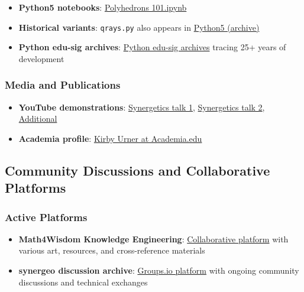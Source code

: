 \documentclass[
  10pt,
]{article}
\newcommand{\passthrough}[1]{#1}
\providecommand{\tightlist}{%
  \setlength{\itemsep}{0pt}\setlength{\parskip}{0pt}}
\begin{document}
\begin{itemize}
\tightlist
\item
  \textbf{Python5 notebooks}:
  \href{https://raw.githubusercontent.com/4dsolutions/Python5/master/Polyhedrons\%20101.ipynb}{Polyhedrons
  101.ipynb}
\item
  \textbf{Historical variants}: \passthrough{\lstinline!qrays.py!} also
  appears in
  \href{https://github.com/4dsolutions/Python5/blob/master/qrays.py}{Python5
  (archive)}
\item
  \textbf{Python edu-sig archives}:
  \href{https://mail.python.org/pipermail/edu-sig/2000-May/000498.html}{Python
  edu-sig archives} tracing 25+ years of development
\end{itemize}

\hypertarget{media-and-publications}{%
\subsubsection{Media and Publications}\label{media-and-publications}}

\begin{itemize}
\tightlist
\item
  \textbf{YouTube demonstrations}:
  \href{https://www.youtube.com/watch?v=g14mu4uWD4E}{Synergetics talk
  1}, \href{https://www.youtube.com/watch?v=i9oij02oje0}{Synergetics
  talk 2},
  \href{https://www.youtube.com/watch?v=D0M1h_gjA_w}{Additional}
\item
  \textbf{Academia profile}:
  \href{https://princeton.academia.edu/kirbyurner}{Kirby Urner at
  Academia.edu}
\end{itemize}

\hypertarget{community-discussions-and-collaborative-platforms}{%
\subsection{Community Discussions and Collaborative
Platforms}\label{community-discussions-and-collaborative-platforms}}

\hypertarget{active-platforms}{%
\subsubsection{Active Platforms}\label{active-platforms}}

\begin{itemize}
\tightlist
\item
  \textbf{Math4Wisdom Knowledge Engineering}:
  \href{https://coda.io/d/_d0SvdI3KSto/Knowledge-Engineering_suxu39sp}{Collaborative
  platform} with various art, resources, and cross-reference materials
\item
  \textbf{synergeo discussion archive}:
  \href{https://groups.io/g/synergeo/topics}{Groups.io platform} with
  ongoing community discussions and technical exchanges
\end{itemize}
\end{document}
